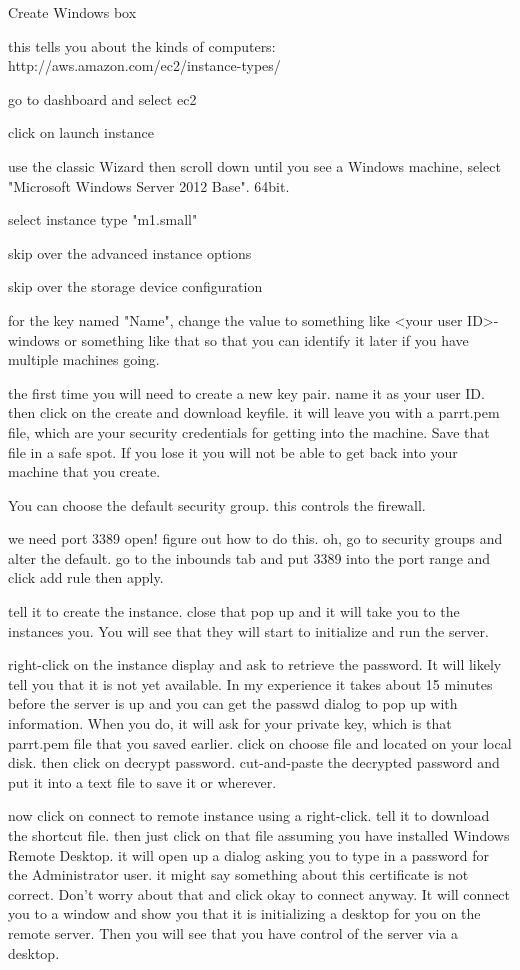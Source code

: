Create Windows box

this tells you about the kinds of computers:
http://aws.amazon.com/ec2/instance-types/

 go to dashboard and select ec2

 click on launch instance

 use the classic Wizard then scroll down until you see a Windows machine, select "Microsoft Windows Server 2012 Base". 64bit.

select instance type "m1.small"

 skip over the advanced instance options

 skip over the storage device configuration

 for the key named "Name", change the value to something like <your user ID>-windows or something like that so that you can identify it later if you have multiple machines going.

 the first time you will need to create a new key pair. name it as your user ID. then click on the create and download keyfile. it will leave you with a parrt.pem file, which are your security credentials for getting into the machine. Save that file in a safe spot. If you lose it you will not be able to get back into your machine that you create. 

You can choose the default security group. this controls the firewall.

 we need port 3389 open! figure out how to do this. oh, go to security groups and alter the default. go to the inbounds tab and put 3389 into the port range and click add rule then apply.

tell it to create the instance. close that pop up and it will take you to the instances you. You will see that they will start to initialize and run the server.

right-click on the instance display and ask to retrieve the password. It will likely tell you that it is not yet available. In my experience it takes about 15 minutes before the server is up and you can get the passwd dialog to pop up with information. When you do, it will ask for your private key, which is that parrt.pem file that you saved earlier. click on choose file and located on your local disk. then click on decrypt password. cut-and-paste the decrypted password and put it into a text file to save it or wherever.

now click on connect to remote instance using a right-click. tell it to download the shortcut file. then just click on that file assuming you have installed Windows Remote Desktop. it will open up a dialog asking you to type in a password for the Administrator user. it might say something about this certificate is not correct. Don't worry about that and click okay to connect anyway. It will connect you to a window and show you that it is initializing a desktop for you on the remote server. Then you will see that you have control of the server via a desktop.